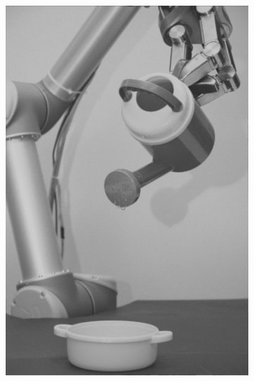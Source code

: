 \begin{figure}[H]
\begin{subfigure}[b]{0.1\textwidth}
        \includegraphics[width=\textwidth]{img3/test/contrast_5_0_8_final_img3.png}
    \end{subfigure}
    \begin{subfigure}[b]{0.1\textwidth}

\end{subfigure}
\end{figure}
